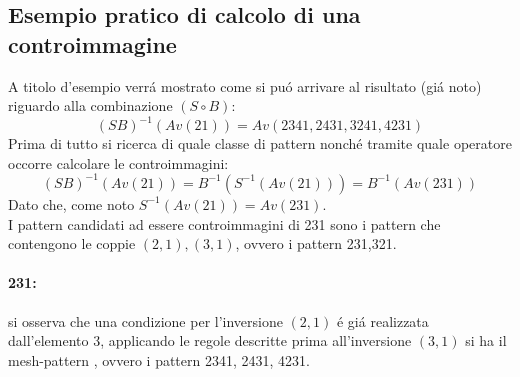 \subsection*{Esempio pratico di calcolo di una controimmagine}
A titolo d'esempio verr\'a mostrato come si pu\'o arrivare al risultato (gi\'a noto\cite{albert2010inverse}) riguardo alla combinazione $(S\circ B)$:
$$(SB)^{-1}(Av(21)) = Av(2341, 2431, 3241, 4231)$$
Prima di tutto si ricerca di quale classe di pattern nonch\'e tramite quale operatore occorre calcolare le controimmagini:
$$(SB)^{-1}(Av(21)) = B^{-1}(S^{-1}(Av(21)))=B^{-1}(Av(231))$$
Dato che, come noto\cite{limbrief} $S^{-1}(Av(21))=Av(231)$.\\
I pattern candidati ad essere controimmagini di 231 sono i pattern che contengono le coppie $(2,1),(3,1)$, ovvero i pattern 231,321.
\paragraph*{231:} si osserva che una condizione per l'inversione $(2,1)$ \'e gi\'a realizzata dall'elemento $3$, applicando le regole descritte prima all'inversione $(3,1)$ si ha il mesh-pattern , ovvero i pattern 2341, 2431, 4231.
